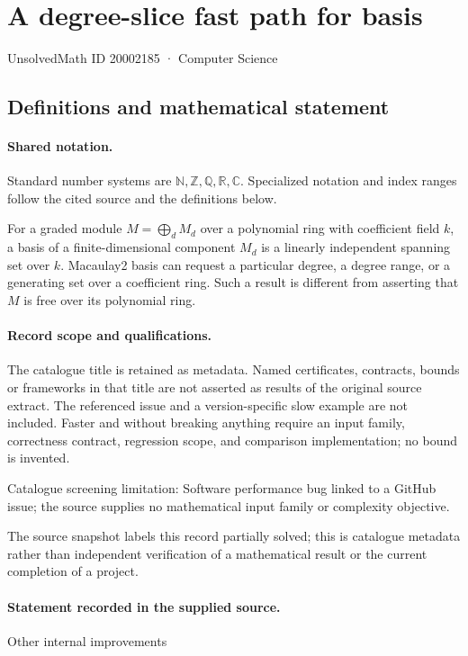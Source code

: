 \documentclass[11pt]{article}
\begin{document}
\setcounter{section}{20002184}
\section{A degree-slice fast path for basis}\label{20002185}
{\small\sffamily UnsolvedMath ID 20002185 · Computer Science}
\subsection{Definitions and mathematical statement}

\paragraph{Shared notation.}Standard number systems are $\mathbb N,\mathbb Z,\mathbb Q,\mathbb R,\mathbb C$. Specialized notation and index ranges follow the cited source and the definitions below.


For a graded module $M=\bigoplus_d M_d$ over a polynomial ring with coefficient field $k$, a basis of a finite-dimensional component $M_d$ is a linearly independent spanning set over $k$. Macaulay2 basis can request a particular degree, a degree range, or a generating set over a coefficient ring. Such a result is different from asserting that $M$ is free over its polynomial ring.
\paragraph{Record scope and qualifications.}
The catalogue title is retained as metadata. Named certificates, contracts, bounds or frameworks in that title are not asserted as results of the original source extract.
The referenced issue and a version-specific slow example are not included. Faster and without breaking anything require an input family, correctness contract, regression scope, and comparison implementation; no bound is invented.

Catalogue screening limitation: Software performance bug linked to a GitHub issue; the source supplies no mathematical input family or complexity objective.

The source snapshot labels this record partially solved; this is catalogue metadata rather than independent verification of a mathematical result or the current completion of a project.
\paragraph{Statement recorded in the supplied source.}
Other internal improvements
\end{document}

